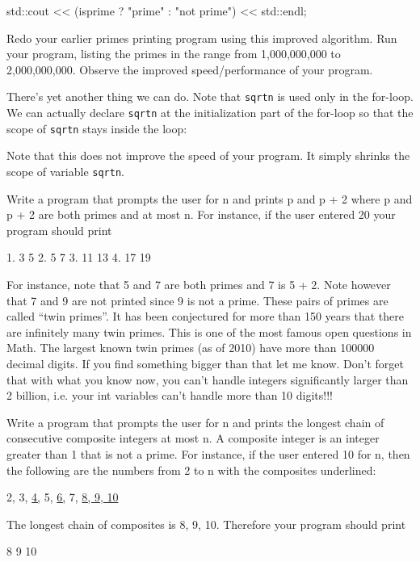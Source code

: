 \begin{console}
\begin{console}[commandchars=\~\@\$]
std::cout << (isprime ? "prime" : "not prime")
          << std::endl;
\end{console}
\begin{ex}
Redo your earlier primes printing program using this
improved algorithm. Run your program, listing the primes in the range
from 1,000,000,000 to 2,000,000,000. Observe the improved
speed/performance of your program.
\end{ex}
There's yet another thing we can do. Note that \texttt{sqrtn} is used only in the for-loop. We can actually declare \texttt{sqrtn} at the initialization part of the for-loop so that the scope of \texttt{sqrtn} stays inside the loop:
Note that this does not improve the speed of your program. It simply
shrinks the scope of variable \texttt{sqrtn}.

\begin{ex}
Write a program that prompts the user for n and
prints p and p + 2 where p and p + 2 are both primes and at most n. For
instance, if the user entered 20 your program should print
\begin{console}
1. 3 5
2. 5 7
3. 11 13
4. 17 19
\end{console}
For instance, note that 5 and 7 are both primes and 7 is 5 + 2. Note
however that 7 and 9 are not printed since 9 is not a prime. These pairs
of primes are called ``twin primes''. It has been conjectured for more
than 150 years that there are infinitely many twin primes. This is one
of the most famous open questions in Math. The largest known twin primes
(as of 2010) have more than 100000 decimal digits. If you find something
bigger than that let me know. Don't forget that with
what you know now, you can't handle integers
significantly larger than 2 billion, i.e. your int variables
can't handle more than 10 digits!!!
\end{ex}
\begin{ex}
Write a program that prompts the user for n and
prints the longest chain of consecutive composite integers at most n. A
composite integer is an integer greater than 1 that is not a prime. For
instance, if the user entered 10 for n, then the following are the
numbers from 2 to n with the composites underlined:
\begin{center}
2, 3, \underline{4,} 5, \underline{6,} 7, \underline{8, 9, 10}
\end{center}
The longest chain of composites is 8, 9, 10. Therefore your program
should print
\begin{console}
8 9 10
\end{console}
\end{ex}


\end{console}
